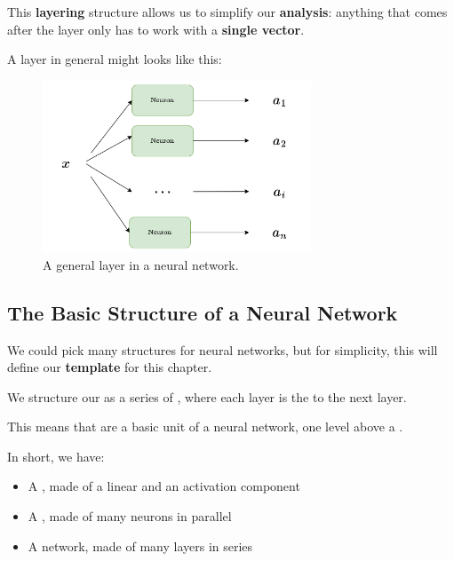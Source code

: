         This \textbf{layering} structure allows us to simplify our \textbf{analysis}: anything that comes after the layer only has to work with a \textbf{single vector}.
        
        A layer in general might looks like this:
        
        \begin{figure}[H]
            \centering
            \includegraphics[width=80mm,scale=0.4]{images/nn_images/general_layer.png}
            \caption*{A general layer in a neural network.}
        \end{figure}
        
    \subsection{The Basic Structure of a Neural Network}
        
        We could pick many structures for neural networks, but for simplicity, this will define our \textbf{template} for this chapter.\\
        
        \begin{definition}
            We structure our  as a series of , where each layer is the  to the next layer.
            
            This means that  are a basic unit of a neural network, one level above a .
        \end{definition}
        
        In short, we have:
        
        \begin{itemize}
            \item A , made of a linear and an activation component
            
            \item A , made of many neurons in parallel
            
            \item A  network, made of many layers in series
        \end{itemize}
        
